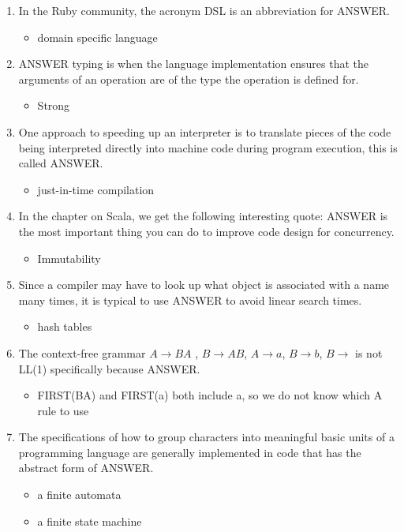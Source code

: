 \documentclass{exam}
\begin{document}
\begin{enumerate}
\item In the Ruby community, the acronym DSL is an abbreviation for ANSWER.
\begin{itemize}
\item domain specific language
\end{itemize}
\item ANSWER typing is when the language implementation ensures that the arguments of an operation are of the type the operation is defined for.
\begin{itemize}
\item Strong
\end{itemize}
\item One approach to speeding up an interpreter is to translate pieces of the code being interpreted directly into machine code during program execution, this is called ANSWER.
\begin{itemize}
\item just-in-time compilation
\end{itemize}
\item In the chapter on Scala, we get the following interesting quote: ANSWER is the most important thing you can do to improve code design for concurrency.
\begin{itemize}
\item Immutability
\end{itemize}
\item Since a compiler may have to look up what object is associated with a name many times, it is typical to use ANSWER to avoid linear search times.
\begin{itemize}
\item hash tables
\end{itemize}
\item The context-free grammar $A \rightarrow B A$ , $B \rightarrow A B$, $A \rightarrow a$, $B \rightarrow b$, $B \rightarrow$  is not LL(1) specifically because ANSWER.
\begin{itemize}
\item FIRST(BA) and FIRST(a) both include a, so we do not know which A rule to use
\end{itemize}
\item The specifications of how to group characters into meaningful basic units of a programming language are generally implemented in code that has the abstract form of ANSWER.
\begin{itemize}
\item a finite automata
\item a finite state machine

\end{itemize}
\end{enumerate}
\end{document}
